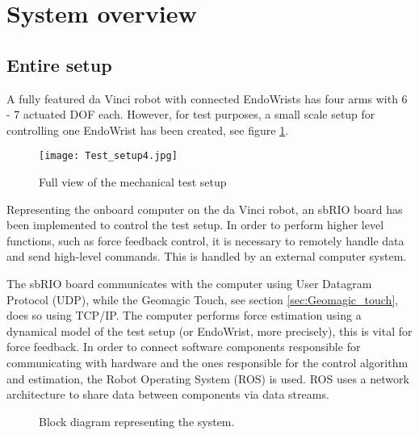 \section{System overview}\label{sec:system_overview}

\subsection{Entire setup}

A fully featured da Vinci robot with connected EndoWrists has four arms with 6 - 7 actuated DOF each.
However, for test purposes, a small scale setup for controlling one EndoWrist has been created, see figure \ref{fig:Mec_d}.

\begin{figure}
    \centering
    \texttt{[image: Test\_setup4.jpg]}
    \caption{Full view of the mechanical test setup}
    \label{fig:Mec_d}
\end{figure}

Representing the onboard computer on the da Vinci robot, an sbRIO board has been implemented to control the test setup. 
In order to perform higher level functions, such as force feedback control, it is necessary to remotely handle data and send high-level commands.
This is handled by an external computer system. %

The sbRIO board communicates with the computer using User Datagram Protocol (UDP), while the Geomagic Touch, see section \ref{sec:Geomagic_touch}, does so using TCP/IP.
The computer performs force estimation using a dynamical model of the test setup (or EndoWrist, more precisely), this is vital for force feedback.
In order to connect software components responsible for communicating with hardware and the ones responsible for the control algorithm and estimation, the Robot Operating System (ROS) is used.
ROS uses a network architecture to share data between components via data streams.


\begin{figure}[h]
\centering
{}
\caption{Block diagram representing the system.}
\end{figure}


